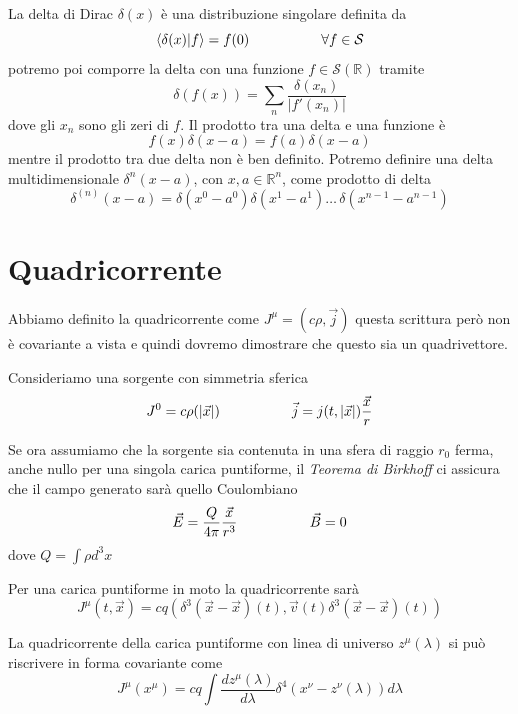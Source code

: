 \documentclass[12pt,a4paper,titlepage, twoside, openright]{book}
\numberwithin{equation}{chapter}
\begin{document}
La delta di Dirac $\delta(x)$ è una distribuzione singolare definita da
\[
\left\langle \delta(x) | f \right\rangle =f(0) \hspace{0.15\linewidth} \forall f\in\mathcal{S}
\]
potremo poi comporre la delta con una funzione $f\in\mathcal{S}(\mathbb{R})$ tramite
\[
\delta\left(f(x)\right) = \sum_n \dfrac{\delta(x_n)}{\left| f'(x_n) \right|}
\] 
dove gli $x_n$ sono gli zeri di $f$.
Il prodotto tra una delta e una funzione è
\[
f(x)\delta(x-a)=f(a)\delta(x-a)
\]
mentre il prodotto tra due delta non è ben definito.
Potremo definire una delta multidimensionale $\delta^n(x-a)$, con $x,a\in\mathbb{R}^n$, come prodotto di delta 
\[
\delta^{(n)}(x-a)=\delta\left(x^0-a^0\right)\delta\left(x^1-a^1\right)\dots\,\delta\left(x^{n-1}-a^{n-1}\right)
\]



\section{Quadricorrente}\label{sezQuadricorrente}
Abbiamo definito la quadricorrente come $J^\mu=(c\rho,\vec{j})$ questa scrittura però non è covariante a vista e quindi dovremo dimostrare che questo sia un quadrivettore.

Consideriamo una sorgente con simmetria sferica
\[
J^0=c\rho(\left|\vec{x}\right|) \hspace{0.15\linewidth}
\vec{j}=j(t,\left|\vec{x}\right|) \dfrac{\vec{x}}{r}
\]

Se ora assumiamo che la sorgente sia contenuta in una sfera di raggio $r_0$ ferma, anche nullo per una singola carica puntiforme, il \textit{Teorema di Birkhoff} ci assicura che il campo  generato sarà quello Coulombiano
\[
\vec{E}=\dfrac{Q}{4\pi}\dfrac{\vec{x}}{r^3} \hspace{0.15\linewidth} \vec{B}=0
\]
dove $Q=\int \rho d^3x$

Per una carica puntiforme in moto la quadricorrente sarà
\begin{equation}
J^\mu (t,\vec{x})=cq\left( \delta^3(\vec{x}-\vec{x})(t) , \vec{v}(t)\delta^3(\vec{x}-\vec{x})(t) \right)
\end{equation}

La quadricorrente della carica puntiforme con linea di universo $z^\mu(\lambda)$ si può riscrivere in forma covariante come
\begin{equation}
J^\mu(x^\mu)=cq \int \dfrac{d z^\mu(\lambda)}{d\lambda}\delta^{4}\left( x^\nu-z^\nu(\lambda) \right) d\lambda
\end{equation}
\end{document}
